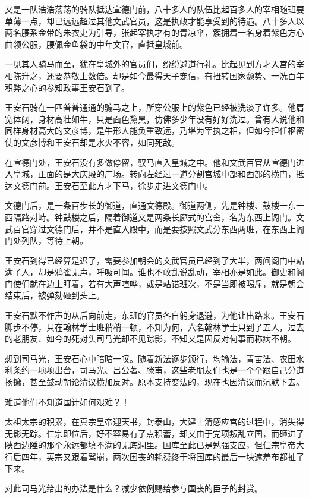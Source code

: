 又是一队浩浩荡荡的骑队抵达宣德门前，八十多人的队伍比起百多人的宰相随班要单薄一点，却已远远超过其他文武官员，这是执政才能享受到的待遇。八十多人以两名腰系金带的朱衣吏为引导，张起宰执才有的青凉伞，簇拥着一名身着紫色方心曲领公服，腰佩金鱼袋的中年文官，直抵皇城前。

一见其人骑马而至，犹在皇城外的官员们，纷纷避道行礼。比起见到方才入宫的宰相陈升之，还要恭敬上数倍。却是如今最得天子宠信，有扭转国家颓势、一洗百年积弊之心的参知政事王安石到了。

王安石骑在一匹普普通通的骟马之上，所穿公服上的紫色已经被洗淡了许多。他肩宽体阔，身材高壮如牛，只是面色黧黑，仿佛多少年没有好好洗过。曾有人说他和同样身材高大的文彦博，是牛形人能负重致远，乃堪为宰执之相，但如今担任枢密使的文彦博和王安石却是水火不容，如同死敌。

在宣德门处，王安石没有多做停留，驭马直入皇城之中。他和文武百官从宣德门进入皇城，正面的是大庆殿的广场。转向左经过一道分割宫城中部和西部的横门，抵达文德门前。王安石至此方才下马，徐步走进文德门中。

文德门后，是一条百步长的御道，直通文德殿。御道两侧，先是钟楼、鼓楼一东一西隔路对峙。钟鼓楼之后，隔着御道又是两条长廊式的宫舍，名为东西上阁门。文武百官穿过文德门后，并不是直入殿中，而是要按照文武分东西两班，在东西上阁门处列队，等待上朝。

王安石到得已经算是迟了，需要参加朝会的文武官员已经到了大半，两间阁门中站满了人，却是鸦雀无声，呼吸可闻。谁也不敢乱说乱动，宰相亦是如此。御史和阁门使们就在边上盯着，若有大声喧哗，或是站错班次，不是当即被喝斥，就是朝会结束后，被弹劾砸到头上。

王安石默不作声的从后向前走，东班的官员各自躬身退避，为他让出路来。王安石脚步不停，只在翰林学士班稍稍一顿，不知为何，六名翰林学士只到了五人，过去的老朋友、如今的死对头司马光却不见踪影，不知又是因反对何事而称病不朝。

想到司马光，王安石心中暗暗一叹。随着新法逐步颁行，均输法，青苗法、农田水利条约一项项出台，司马光、吕公著、滕甫，这些老朋友们也是一个个跟自己分道扬镳，甚至鼓动朝论清议横加反对。原本支持变法的，现在也因清议而沉默下去。

难道他们不知道国计如何艰难？！

太祖太宗的积累，在真宗皇帝迎天书，封泰山，大建上清感应宫的过程中，消失得无影无踪。仁宗即位后，好不容易有了点积蓄，却又由于党项叛乱立国，而砸进了陕西边陲的那个永远都填不满的无底洞里。国库至此已是勉强支应，但仁宗皇帝大行后四年，英宗又跟着驾崩，两次国丧的耗费终于将国库的最后一块遮羞布都扯了下来。

对此司马光给出的办法是什么？减少依例赐给参与国丧的臣子的封赏。

